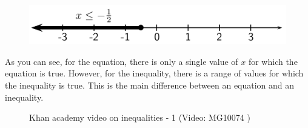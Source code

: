     \setcounter{subfigure}{0}


	\begin{figure}[H] %
    \begin{center}
    \label{m39254*id157774!!!underscore!!!media}\label{m39254*id157774!!!underscore!!!printimage}\includegraphics[width=.8\columnwidth]{col11306.imgs/m39254_MG10C10_002.png} %
        
      \vspace{2pt}
    \vspace{.1in}
    
    \end{center}

 \end{figure}   

    \addtocounter{footnote}{-0}
    
      \par 
      \label{m39254*id157780}As you can see, for the equation, there is only a single value of \begin{math}x\end{math} for which the equation is true. However, for the inequality, there is a range of values for which the inequality is true. This is the main difference between an equation and an inequality.\par 
\label{m39254*eip-441}
    \setcounter{subfigure}{0}


	\begin{figure}[H] %
    
    
    \textnormal{Khan academy video on inequalities - 1}\vspace{.1in} \nopagebreak
  \label{m39254*yt-media4}\label{m39254*yt-video4}
             { (Video:  MG10074 )}
      
      \vspace{2pt}
    \vspace{.1in}
    
    

 \end{figure}   

